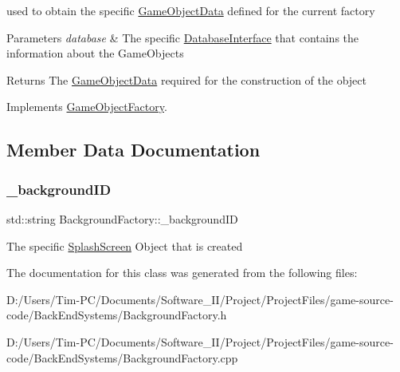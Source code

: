 used to obtain the specific \hyperlink{struct_game_object_data}{Game\+Object\+Data} defined for the current factory 


\begin{DoxyParams}{Parameters}
{\em database} & The specific \hyperlink{class_database_interface}{Database\+Interface} that contains the information about the Game\+Objects \\
\hline
\end{DoxyParams}
\begin{DoxyReturn}{Returns}
The \hyperlink{struct_game_object_data}{Game\+Object\+Data} required for the construction of the object 
\end{DoxyReturn}


Implements \hyperlink{class_game_object_factory_ae9358fbb3ef2d3b127320341760d3ff9}{Game\+Object\+Factory}.



\subsection{Member Data Documentation}
\mbox{\label{class_background_factory_a88dfa3ed001d4975bc8a76f5603d5017}} 
\subsubsection{\texorpdfstring{\+\_\+background\+ID}{\_backgroundID}}
{\footnotesize\ttfamily std\+::string Background\+Factory\+::\+\_\+background\+ID\hspace{0.3cm}{\ttfamily [private]}}

The specific \hyperlink{class_splash_screen}{Splash\+Screen} Object that is created 

The documentation for this class was generated from the following files\+:\begin{DoxyCompactItemize}
\item 
D\+:/\+Users/\+Tim-\/\+P\+C/\+Documents/\+Software\+\_\+\+I\+I/\+Project/\+Project\+Files/game-\/source-\/code/\+Back\+End\+Systems/Background\+Factory.\+h\item 
D\+:/\+Users/\+Tim-\/\+P\+C/\+Documents/\+Software\+\_\+\+I\+I/\+Project/\+Project\+Files/game-\/source-\/code/\+Back\+End\+Systems/Background\+Factory.\+cpp\end{DoxyCompactItemize}
